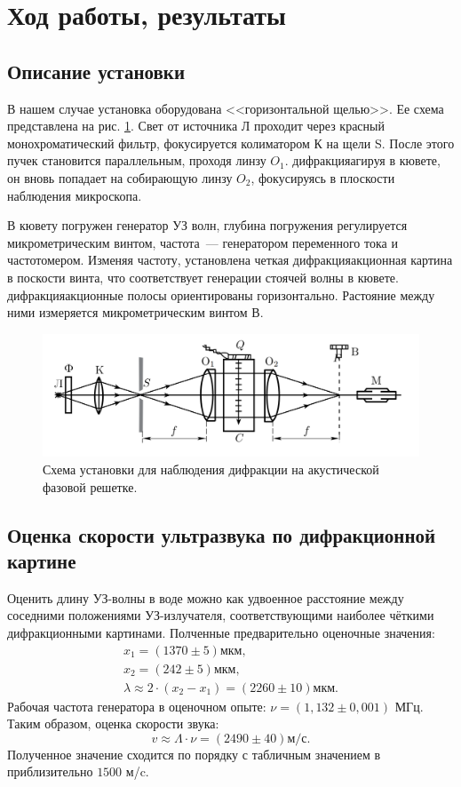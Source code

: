 \section{Ход работы, результаты}

\subsection{Описание установки}
В нашем случае установка оборудована <<горизонтальной щелью>>. Ее схема представлена на рис. \ref{fig:schema1}. Свет от источника Л проходит через красный монохроматический фильтр, фокусируется колиматором К на щели S. После этого пучек становится параллельным, проходя линзу $O_1$. дифракцияагируя в кювете, он вновь попадает на собирающую линзу $O_2$, фокусируясь в плоскости наблюдения микроскопа.

В кювету погружен генератор УЗ волн, глубина погружения регулируется микрометрическим винтом, частота~--- генератором переменного тока и частотомером. Изменяя частоту, установлена четкая дифракцияакционная картина в поскости винта, что соответствует генерации стоячей волны в кювете. дифракцияакционные полосы ориентированы горизонтально.
Растояние между ними измеряется микрометрическим винтом В.

\begin{figure}[!h]
	\centering
	\includegraphics[width=0.6\linewidth]{pics/schema1.png}
	\caption{Схема установки для наблюдения дифракции на акустической фазовой                   решетке.}
	\label{fig:schema1}
\end{figure}

\subsection{Оценка скорости ультразвука по дифракционной картине}
Оценить длину УЗ-волны в воде можно как удвоенное расстояние между соседними положениями УЗ-излучателя, соответствующими наиболее чёткими дифракционными картинами. 
Полченные предварительно оценочные значения: 
\begin{gather*}
    x_1 = (1370 \pm 5) \text{мкм}, \\
    x_2 = (242 \pm 5) \text{мкм}, \\
    \lambda \approx 2 \cdot (x_2 - x_1) = (2260 \pm 10) \text{мкм}.
\end{gather*}
Рабочая частота генератора в оценочном опыте: $\nu = (1,132 \pm 0,001)$ МГц. Таким образом, оценка скорости звука:
\[
v \approx \Lambda \cdot \nu = (2490 \pm 40) \text{м/с}.
\]
Полученное значение сходится по порядку с табличным значением в приблизительно $1500$ м/c.

